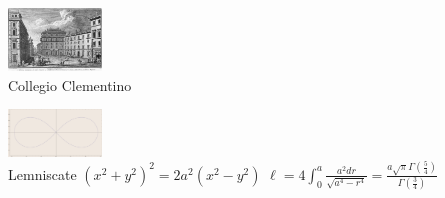 \documentclass[10pt,handout]{beamer} %
\begin{document}
\begin{frame}
\begin{columns}[c]
\begin{column}{4cm}
\includegraphics[width=2.5cm]{images/ColegioClementino.jpg}\\
\scriptsize{Collegio Clementino}
\bigskip

\includegraphics[width=2.5cm]{images/lemniscate.pdf}\\
\scriptsize{\quad Lemniscate $(x^2+y^2)^2=2a^2(x^2-y^2)$
$\ell=4\int_0^a\frac{a^2dr}{\sqrt{a^4-r^4}}=\frac{a \sqrt\pi\Gamma(\frac54)}{\Gamma(\frac34)}$}
\end{column}
\end{columns}
\end{frame}
\end{document}
